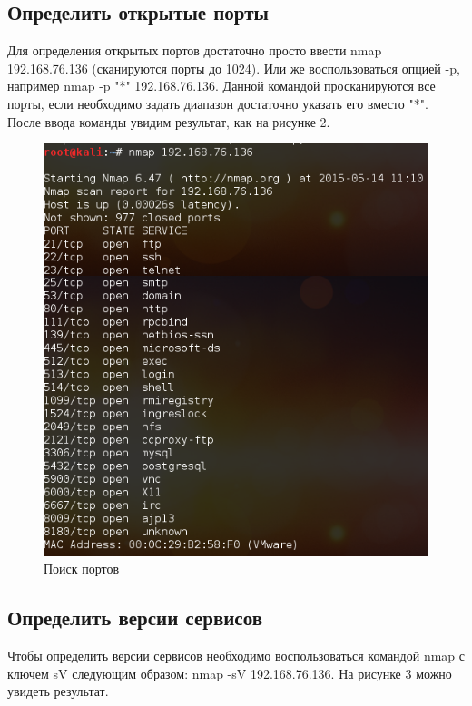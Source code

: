 \documentclass[11pt, a4paper]{article}		%
\begin{document}

\subsection{Определить открытые порты}

Для определения открытых портов достаточно просто ввести nmap 192.168.76.136 (сканируются порты до 1024). Или же воспользоваться опцией -p, например nmap -p "*" 192.168.76.136. Данной командой просканируются все порты, если необходимо задать диапазон достаточно указать его вместо "*".
После ввода команды увидим результат, как на рисунке 2.

\begin{figure}[h!]
\centering
\includegraphics[scale=0.75]{res/ports_scan}
\caption{Поиск портов}
\end{figure}


\subsection{Определить версии сервисов}

Чтобы определить версии сервисов необходимо воспользоваться командой nmap с ключем sV следующим образом: nmap -sV 192.168.76.136. На рисунке 3 можно увидеть результат.
\end{document}
